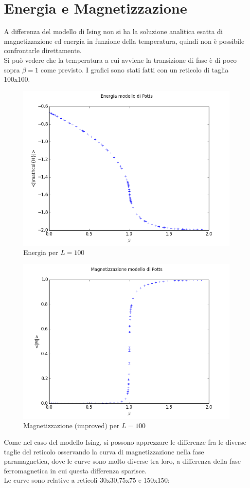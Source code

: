 \section{Energia e Magnetizzazione}
A differenza del modello di Ising non si ha la soluzione analitica esatta di magnetizzazione ed energia in funzione della temperatura, quindi non è possibile confrontarle direttamente.\\
Si può vedere che la temperatura a cui avviene la transizione di fase è di poco sopra $\beta=1$ come previsto. I grafici sono stati fatti con un reticolo di taglia 100x100.
\begin{figure}[h!]
	\centering
	\includegraphics[scale=0.55]{potts/en100.png}
	\caption{Energia per $L=100$}
\end{figure}
\begin{figure}[h!]
	\centering
	\includegraphics[scale=0.55]{potts/mag100.png}
	\caption{Magnetizzazione (improved) per $L=100$}
\end{figure}
Come nel caso del modello Ising, si possono apprezzare le differenze fra le diverse taglie del reticolo osservando la curva di magnetizzazione nella fase paramagnetica, dove le curve sono molto diverse tra loro, a differenza della fase ferromagnetica in cui questa differenza sparisce.\\
Le curve sono relative a reticoli 30x30,75x75 e 150x150:

